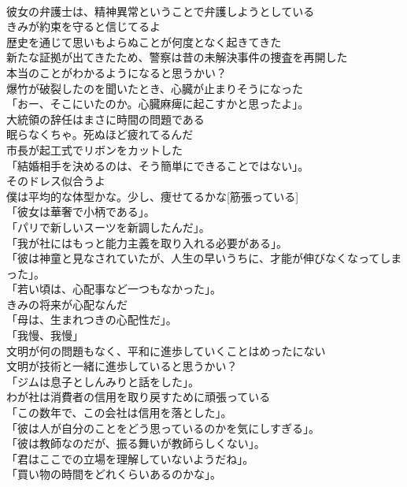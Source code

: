 \documentclass[8pt]{extreport}
\begin{document}
\begin{CJK}{UTF8}{min}
\\	彼女の弁護士は、精神異常ということで弁護しようとしている	
\\	きみが約束を守ると信じてるよ	
\\	歴史を通じて思いもよらぬことが何度となく起きてきた	
\\	新たな証拠が出てきたため、警察は昔の未解決事件の捜査を再開した	
\\	本当のことがわかるようになると思うかい？	
\\	爆竹が破裂したのを聞いたとき、心臓が止まりそうになった	
\\	「おー、そこにいたのか。心臓麻痺に起こすかと思ったよ」。	
\\	大統領の辞任はまさに時間の問題である	
\\	眠らなくちゃ。死ぬほど疲れてるんだ	
\\	市長が起工式でリボンをカットした	
\\	「結婚相手を決めるのは、そう簡単にできることではない」。	
\\	そのドレス似合うよ	
\\	僕は平均的な体型かな。少し、痩せてるかな[筋張っている]	
\\	「彼女は華奢で小柄である」。	
\\	「パリで新しいスーツを新調したんだ」。	
\\	「我が社にはもっと能力主義を取り入れる必要がある」。	
\\	「彼は神童と見なされていたが、人生の早いうちに、才能が伸びなくなってしまった」。	
\\	「若い頃は、心配事など一つもなかった」。	
\\	きみの将来が心配なんだ	
\\	「母は、生まれつきの心配性だ」。	
\\	「我慢、我慢」	
\\	文明が何の問題もなく、平和に進歩していくことはめったにない	
\\	文明が技術と一緒に進歩していると思うかい？	
\\	「ジムは息子としんみりと話をした」。	
\\	わが社は消費者の信用を取り戻すために頑張っている	
\\	「この数年で、この会社は信用を落とした」。	
\\	「彼は人が自分のことをどう思っているのかを気にしすぎる」。	
\\	「彼は教師なのだが、振る舞いが教師らしくない」。	
\\	「君はここでの立場を理解していないようだね」。	
\\	「買い物の時間をどれくらいあるのかな」。	

\end{CJK}
\end{document}
